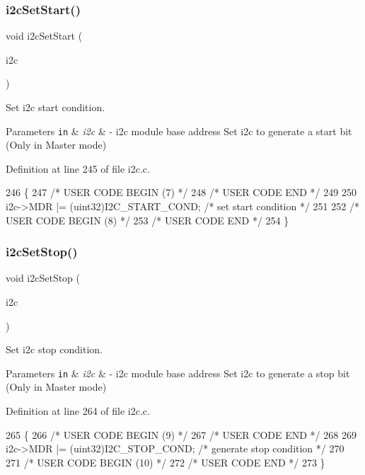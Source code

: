 \subsubsection{\texorpdfstring{i2c\+Set\+Start()}{i2cSetStart()}}
{\footnotesize\ttfamily void i2c\+Set\+Start (\begin{DoxyParamCaption}\item[{\mbox{\hyperlink{reg__i2c_8h_a5d6c119fb20e803a530d0d4df544daf7}{i2c\+B\+A\+S\+E\+\_\+t}} $\ast$}]{i2c }\end{DoxyParamCaption})}



Set i2c start condition. 


\begin{DoxyParams}[1]{Parameters}
\mbox{\tt in}  & {\em i2c} & -\/ i2c module base address Set i2c to generate a start bit (Only in Master mode) \\
\hline
\end{DoxyParams}


Definition at line 245 of file i2c.\+c.


\begin{DoxyCode}
246 \{
247 \textcolor{comment}{/* USER CODE BEGIN (7) */}
248 \textcolor{comment}{/* USER CODE END */}
249 
250     i2c->MDR |= (uint32)I2C\_START\_COND;  \textcolor{comment}{/* set start condition */}
251 
252 \textcolor{comment}{/* USER CODE BEGIN (8) */}
253 \textcolor{comment}{/* USER CODE END */}
254 \}
\end{DoxyCode}
\mbox{\label{group__I2C_ga65c7cf88cef1e3164da5fda0ecf77c78}} 
\subsubsection{\texorpdfstring{i2c\+Set\+Stop()}{i2cSetStop()}}
{\footnotesize\ttfamily void i2c\+Set\+Stop (\begin{DoxyParamCaption}\item[{\mbox{\hyperlink{reg__i2c_8h_a5d6c119fb20e803a530d0d4df544daf7}{i2c\+B\+A\+S\+E\+\_\+t}} $\ast$}]{i2c }\end{DoxyParamCaption})}



Set i2c stop condition. 


\begin{DoxyParams}[1]{Parameters}
\mbox{\tt in}  & {\em i2c} & -\/ i2c module base address Set i2c to generate a stop bit (Only in Master mode) \\
\hline
\end{DoxyParams}


Definition at line 264 of file i2c.\+c.


\begin{DoxyCode}
265 \{
266 \textcolor{comment}{/* USER CODE BEGIN (9) */}
267 \textcolor{comment}{/* USER CODE END */}
268 
269     i2c->MDR |= (uint32)I2C\_STOP\_COND;  \textcolor{comment}{/* generate stop condition */}
270 
271 \textcolor{comment}{/* USER CODE BEGIN (10) */}
272 \textcolor{comment}{/* USER CODE END */}
273 \}
\end{DoxyCode}
